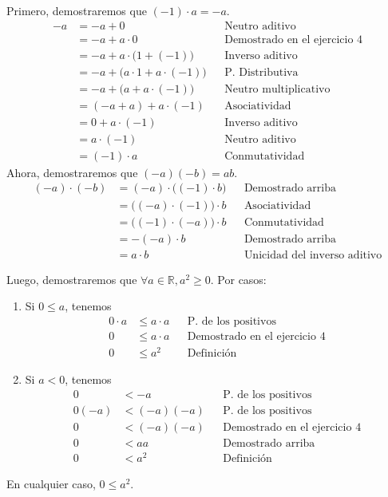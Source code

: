 \documentclass[11pt]{article}
\newcommand{\R}{\mathbb{R}}
\begin{document}
\begin{enumerate}
Primero, demostraremos que $(-1)\cdot a=-a$. \begin{align*}
    -a&=-a+0 && \text{Neutro aditivo} \\
    &=-a+a \cdot 0 && \text{Demostrado en el ejercicio 4} \\
    &=-a+a \cdot  \bigl( 1+ \left( -1 \right)  \bigr) && \text{Inverso aditivo} \\
    &=-a+ \bigl( a \cdot 1+a \cdot  \left( -1 \right)  \bigr) && \text{P. Distributiva} \\
    &=-a+ \bigl( a+a \cdot  \left( -1 \right)  \bigr) && \text{Neutro multiplicativo} \\
    &= \left( -a+a \right) +a \cdot  \left( -1 \right) && \text{Asociatividad} \\
    &=0+a \cdot  \left( -1 \right) && \text{Inverso aditivo} \\
    &=a \cdot  \left( -1 \right) && \text{Neutro aditivo} \\
    &= \left( -1 \right)  \cdot a && \text{Conmutatividad}
\end{align*}
Ahora, demostraremos que $(-a)(-b)=ab$. \begin{align*}
  (-a) \cdot (-b) &= (-a) \cdot \bigl( (-1) \cdot b \bigr) && \text{Demostrado arriba}\\
  &= \bigl( (-a) \cdot (-1) \bigr) \cdot b && \text{Asociatividad}\\
  &= \bigl( (-1) \cdot (-a) \bigr) \cdot b && \text{Conmutatividad}\\
  &= -(-a) \cdot b && \text{Demostrado arriba}\\
  &= a \cdot b && \text{Unicidad del inverso aditivo}
\end{align*}

Luego, demostraremos que $\forall a\in \R, a^2\geq0$. Por casos:
  \begin{enumerate}[label=\alph*)]
    \item Si $0 \leq a$, tenemos \begin{align*}
      0 \cdot a &\leq a \cdot a && \text{P. de los positivos}\\
      0 &\leq a \cdot a && \text{Demostrado en el ejercicio 4}\\
      0 &\leq a^2 && \text{Definición}
    \end{align*}
    \item Si $a<0$, tenemos \begin{align*}
      0 &< -a && \text{P. de los positivos}\\
      0 (-a) &< (-a) (-a) && \text{P. de los positivos}\\
      0 &< (-a) (-a) && \text{Demostrado en el ejercicio 4}\\
      0 &< a a && \text{Demostrado arriba}\\
      0 &< a^2 && \text{Definición}
    \end{align*}
\end{enumerate} En cualquier caso, $0\leq a^2$.



\end{enumerate}
\end{document}
